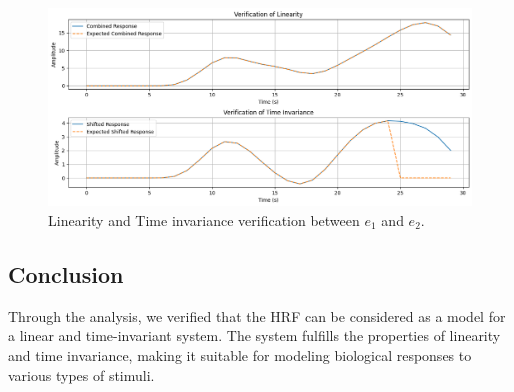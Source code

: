 \documentclass[10pt]{article}
\theoremstyle{definition}
\theoremstyle{remark}
\theoremstyle{definition}
\numberwithin{equation}{prob}
\begin{document}
\begin{figure}[H]
    \centering
    \includegraphics[width=0.8\linewidth]{./figures/Response Verification Inputs e1 and e2.png}
    \caption{Linearity and Time invariance verification between $e_1$ and $e_2$.}
\end{figure}


\subsection*{Conclusion}
Through the analysis, we verified that the HRF can be considered as a model for a linear and time-invariant system. The system fulfills the properties of linearity and time invariance, making it suitable for modeling biological responses to various types of stimuli.
\end{document}
